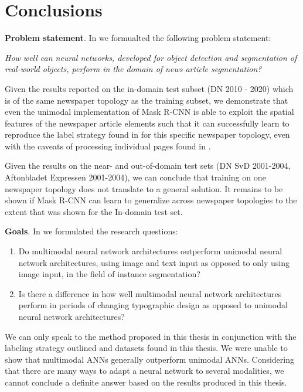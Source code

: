 \documentclass[oneside, english, bibtex]{kththesis}
\begin{document}
\section{Conclusions}

\textbf{Problem statement}. In  we formualted the following problem statement:

\textit{How well can neural networks, developed for object detection and segmentation of real-world objects, perform in the domain of news article segmentation?}

Given the results reported on the in-domain test subset (DN 2010 - 2020) which is of the same newspaper topology as the training subset, we demonstrate that even the unimodal implementation of Mask R-CNN is able to exploit the spatial features of the newspaper article elements such that it can successfully learn to reproduce the label strategy found in  for this specific newspaper topology, even with the caveats of processing individual pages found in .

Given the results on the near- and out-of-domain test sets (DN SvD 2001-2004, Aftonbladet Expressen 2001-2004), we can conclude that training on one newspaper topology does not translate to a general solution. It remains to be shown if Mask R-CNN can learn to generalize across newspaper topologies to the extent that was shown for the In-domain test set.


\textbf{Goals}. In  we formulated the research questions:

\begin{enumerate}
\item Do multimodal neural network architectures outperform unimodal neural network architectures, using image and text input as opposed to only using image input, in the field of instance segmentation?
\item Is there a difference in how well multimodal neural network architectures perform in periods of changing typographic design as opposed to unimodal neural network architectures?
\end{enumerate}

We can only speak to the method proposed in this thesis in conjunction with the labeling strategy outlined and datasets found in this thesis. We were unable to show that multimodal ANNs generally outperform unimodal ANNs. Considering that there are many ways to adapt a neural network to several modalities, we cannot conclude a definite answer based on the results produced in this thesis. 
\end{document}
